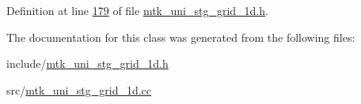 Definition at line \hyperlink{mtk__uni__stg__grid__1d_8h_source_l00179}{179} of file \hyperlink{mtk__uni__stg__grid__1d_8h_source}{mtk\-\_\-uni\-\_\-stg\-\_\-grid\-\_\-1d.\-h}.



The documentation for this class was generated from the following files\-:\begin{DoxyCompactItemize}
\item 
include/\hyperlink{mtk__uni__stg__grid__1d_8h}{mtk\-\_\-uni\-\_\-stg\-\_\-grid\-\_\-1d.\-h}\item 
src/\hyperlink{mtk__uni__stg__grid__1d_8cc}{mtk\-\_\-uni\-\_\-stg\-\_\-grid\-\_\-1d.\-cc}\end{DoxyCompactItemize}
